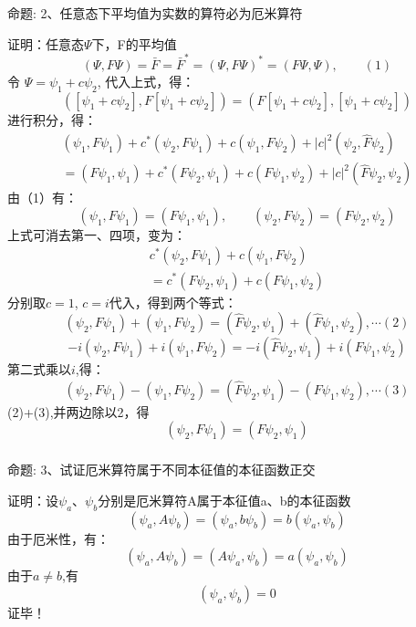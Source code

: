 \begin{frame} [allowframebreaks=]
    \frametitle{}
    \begin{tcolorbox1}{命题:}
       2、任意态下平均值为实数的算符必为厄米算符
    \end{tcolorbox1}
    \alert{证明：}任意态$\Psi$下，F的平均值
    $$(\Psi,F\Psi)=\bar{F}=\bar{F}^*=(\Psi,F\Psi)^*=(F\Psi,\Psi), \qquad (1) $$
    令 $\Psi= \psi_1+c\psi_2 $, 代入上式，得：
    $$([\psi_1+c\psi_2],F [\psi_1+c\psi_2])=(F[\psi_1+c\psi_2],[\psi_1+c\psi_2]) $$
    进行积分，得：
    $$
    \begin{array}{r}
    \left(\psi_{1}, F \psi_{1}\right)+c^{*}\left(\psi_{2}, F \psi_{1}\right)+c\left(\psi_{1}, F \psi_{2}\right)+|c|^{2}\left(\psi_{2}, \hat{F} \psi_{2}\right) \\
    =\left(F \psi_{1}, \psi_{1}\right)+c^{*}\left(F \psi_{2}, \psi_{1}\right)+c\left(F \psi_{1}, \psi_{2}\right)+|c|^{2}\left(\hat{F} \psi_{2}, \psi_{2}\right)
    \end{array}
    $$
    由（1）有： 
    $$(\psi_1,F\psi_1)=(F \psi_1, \psi_1), \qquad (\psi_2,F\psi_2)=(F \psi_2, \psi_2) $$
    上式可消去第一、四项，变为：
    $$\begin{array}{r}
        c^{*}\left(\psi_{2}, F \psi_{1}\right)+c\left(\psi_{1}, F \psi_{2}\right) \\
        =c^{*}\left(F \psi_{2}, \psi_{1}\right)+c\left(F \psi_{1}, \psi_{2}\right)
    \end{array}$$
    分别取$c=1$, $c=i$代入，得到两个等式：
    $$  \left(\psi_{2}, F \psi_{1}\right)+\left(\psi_{1}, F \psi_{2}\right) = 
    \left(\hat{F} \psi_{2}, \psi_{1}\right)+\left(\hat{F} \psi_{1}, \psi_{2}\right) , \cdots (2)
    $$
    $$
    -i\left(\psi_{2}, F \psi_{1}\right)+i\left(\psi_{1}, F \psi_{2}\right) 
    =-i\left(\hat{F} \psi_{2}, \psi_{1}\right)+i\left(F \psi_{1}, \psi_{2}\right)
    $$
    第二式乘以$i$,得：
    $$
    \left(\psi_{2}, F \psi_{1}\right)-\left(\psi_{1}, F \psi_{2}\right) 
    =\left(\hat{F} \psi_{2}, \psi_{1}\right)-\left(F \psi_{1}, \psi_{2}\right), \cdots (3)
    $$
    (2)+(3),并两边除以2，得
    $$
    \left(\psi_{2}, F \psi_{1}\right) =\left(F \psi_{2}, \psi_{1}\right)
    $$
\end{frame} 
\begin{frame} [allowframebreaks=]
    \frametitle{}
    \begin{tcolorbox1}{命题:}
        3、试证厄米算符属于不同本征值的本征函数正交
     \end{tcolorbox1}
    \alert{证明：}设$\psi_a$、$\psi_b$分别是厄米算符A属于本征值a、b的本征函数
    \begin{equation*}
        (\psi_a, A\psi_b)=(\psi_a, b\psi_b)=b(\psi_a, \psi_b)
    \end{equation*}  
    由于厄米性，有：
    \begin{equation*}
        (\psi_a, A\psi_b)=(A\psi_a, \psi_b)=a(\psi_a, \psi_b)
    \end{equation*}
    由于$a\neq b$,有
    \begin{equation*}
        (\psi_a, \psi_b)=0
    \end{equation*}
   证毕！
\end{frame} 

